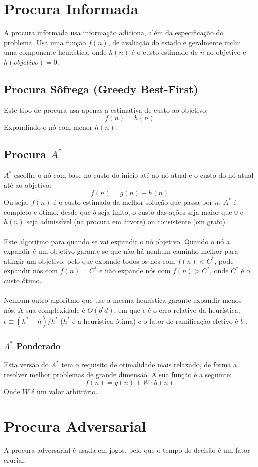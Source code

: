 \documentclass[10pt,a4paper]{report}
\begin{document}
\section{Procura Informada}
A procura informada usa informação adiciona, além da especificação do problema. Usa uma função $f(n)$, de avaliação do estado e geralmente inclui uma componente heurística, onde $h(n)$ é o custo estimado de $n$ ao objetivo e $h(objetivo) = 0$.
\subsection{Procura Sôfrega (Greedy Best-First)}
Este tipo de procura usa apenas a estimativa de custo ao objetivo:
$$
f(n) = h(n)
$$
Expandindo o nó com menor $h(n)$.
\subsection{Procura $A^*$}
$A^*$ escolhe o nó com base no custo do inicio até ao nó atual e o custo do nó atual até ao objetivo:
$$
f(n) = g(n) + h(n)
$$
Ou seja, $f(n)$ é o custo estimado da melhor solução que passa por $n$. $A^*$ é completo e ótimo, desde que $b$ seja finito, o custo das ações seja maior que 0 e $h(n)$ seja admissível (na procura em árvore) ou consistente (em grafo).\\
\\
Este algoritmo para quando se vai expandir o nó objetivo. Quando o nó a expandir é um objetivo garante-se que não há nenhum caminho melhor para atingir um objetivo, pelo que expande todos os nós com $f(n) < C^*$, pode expandir nós com $f(n) = C^*$ e não expande nós com $f(n) > C^*$, onde $C^*$ é o custo ótimo.\\
\\
Nenhum outro algoritmo que use a mesma heurística garante expandir menos nós. A sua complexidade é $O(b^\epsilon d)$, em que $\epsilon$ é o erro relativo da heurística, $\epsilon \equiv (h^*  - h)/h^*$ ($h^*$ é a heurística ótima) e o fator de ramificação efetivo é $b^\epsilon$.
\subsubsection{$A^*$ Ponderado}
Esta versão do $A^*$ tem o requisito de otimalidade mais relaxado, de forma a resolver melhor problemas de grande dimensão. A sua função é a seguinte:
$$
f(n) = g(n) + W \cdot h(n)
$$
Onde $W$ é um valor arbitrário.
\section{Procura Adversarial}
A procura adversarial é usada em jogos, pelo que o tempo de decisão é um fator crucial.
\end{document}
